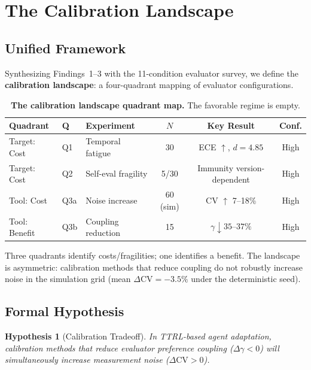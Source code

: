 \documentclass[11pt]{article}
\newcommand{\CV}{\ensuremath{\mathrm{CV}}}
\newtheorem{hypothesis}{Hypothesis}
\theoremstyle{definition}
\theoremstyle{remark}
\begin{document}
\section{The Calibration Landscape}

\subsection{Unified Framework}

Synthesizing Findings~1--3 with the 11-condition evaluator survey, we define the \textbf{calibration landscape}: a four-quadrant mapping of evaluator configurations.

\begin{table}[H]
\centering
\caption{\textbf{The calibration landscape quadrant map.} The favorable regime is empty.}
\begin{tabular}{@{}lllccc@{}}
\toprule
Quadrant & Q & Experiment & $N$ & Key Result & Conf. \\
\midrule
Target: Cost & Q1 & Temporal fatigue & 30 & ECE $\uparrow$, $d{=}4.85$ & High \\
Target: Cost & Q2 & Self-eval fragility & 5/30 & Immunity version-dependent & High \\
Tool: Cost & Q3a & Noise increase & 60 (sim) & CV $\uparrow$ 7--18\% & High \\
Tool: Benefit & Q3b & Coupling reduction & 15 & $\gamma \downarrow 35$--$37\%$ & High \\
\bottomrule
\end{tabular}
\end{table}

Three quadrants identify costs/fragilities; one identifies a benefit. The landscape is asymmetric: calibration methods that reduce coupling do not robustly increase noise in the simulation grid (mean $\Delta\CV = -3.5\%$ under the deterministic seed).

\subsection{Formal Hypothesis}

\begin{hypothesis}[Calibration Tradeoff]\label{hyp:tradeoff}
In TTRL-based agent adaptation, calibration methods that reduce evaluator preference coupling ($\Delta\gamma < 0$) will simultaneously increase measurement noise ($\Delta\CV > 0$).
\end{hypothesis}
\end{document}
